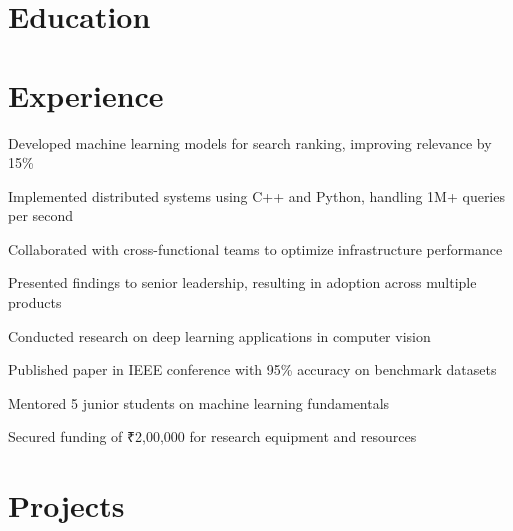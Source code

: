 \documentclass{templates/academic1.cls}
\institute{National Institute of Technology, Patna}
\begin{document}
\makeheader

\section{\textbf{Education}}
\vspace{1mm}
\vspace{-4mm}

\section{\textbf{Experience}}
\vspace{-0.4mm}
\resumeSubHeadingListStart

\resumeItemListStart
    \item Developed machine learning models for search ranking, improving relevance by 15\%
    \item Implemented distributed systems using C++ and Python, handling 1M+ queries per second
    \item Collaborated with cross-functional teams to optimize infrastructure performance
    \item Presented findings to senior leadership, resulting in adoption across multiple products
\resumeItemListEnd

\resumeItemListStart
    \item Conducted research on deep learning applications in computer vision
    \item Published paper in IEEE conference with 95\% accuracy on benchmark datasets
    \item Mentored 5 junior students on machine learning fundamentals
    \item Secured funding of ₹2,00,000 for research equipment and resources
\resumeItemListEnd

\resumeSubHeadingListEnd
\vspace{-6mm}

\section{\textbf{Projects}}
\vspace{-0.4mm}
\resumeSubHeadingListStart
\end{document}
